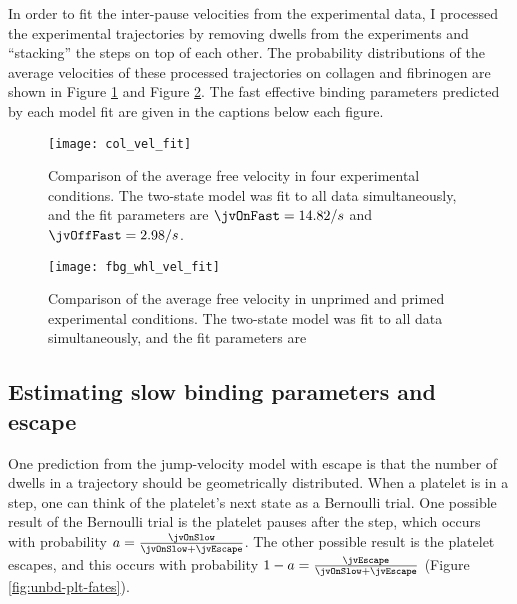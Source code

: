 In order to fit the inter-pause velocities from the experimental data,
I processed the experimental trajectories by removing dwells from the
experiments and ``stacking'' the steps on top of each other. The
probability distributions of the average velocities of these processed
trajectories on collagen and fibrinogen are shown in Figure
\ref{fig:col-vel-fit} and Figure \ref{fig:fbg-whl-vel-fit}. The fast
effective binding parameters predicted by each model fit are given in
the captions below each figure.

\begin{figure}
  \centering
  \texttt{[image: col\_vel\_fit]}
  \caption{Comparison of the average free velocity in four
    experimental conditions. The two-state model was fit to all data
    simultaneously, and the fit parameters are $\jvOnFast = 14.82 / s$
    and $\jvOffFast = 2.98 / s$.}
  \label{fig:col-vel-fit}
\end{figure}

\begin{figure}
  \centering
  \texttt{[image: fbg\_whl\_vel\_fit]}
  \caption{Comparison of the average free velocity in unprimed and
    primed experimental conditions. The two-state model was fit to all
    data simultaneously, and the fit parameters are }
  \label{fig:fbg-whl-vel-fit}
\end{figure}


\subsection{Estimating slow binding parameters and escape}
\label{sec:estim-slow-bind}

One prediction from the jump-velocity model with escape is that the
number of dwells in a trajectory should be geometrically
distributed. When a platelet is in a step, one can think of the
platelet's next state as a Bernoulli trial. One possible result of
the Bernoulli trial is the platelet pauses after the step, which
occurs with probability $a = \frac{\jvOnSlow}{\jvOnSlow +
  \jvEscape}$. The other possible result is the platelet escapes, and
this occurs with probability
$1 - a = \frac{\jvEscape}{\jvOnSlow + \jvEscape}$ (Figure
\ref{fig:unbd-plt-fates}).

